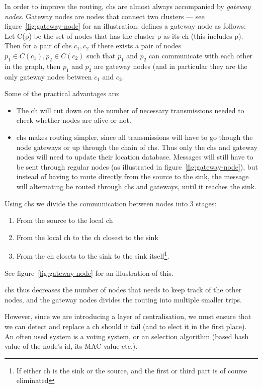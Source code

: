 In order to improve the routing, \acp{ch} are almost always accompanied by \emph{gateway nodes}. Gateway nodes are nodes that connect two clusters --- see figure~\ref{fig:gateway-node} for an illustration. \cite{spanners} defines a gateway node as follows:
Let C(p) be the set of nodes that has the cluster p as its \ac{ch} (this includes p). Then for a pair of \acp{ch} $c_1, c_2$ if there exists a pair of nodes $p_1 \in C(c_1), p_2 \in C(c_2)$ such that $p_1$ and $p_2$ can communicate with each other in the graph, then $p_1$ and $p_2$ are gateway nodes (and in particular they are the only gateway nodes between $c_1$ and $c_2$.  

Some of the practical advantages are:
\begin{itemize}
\item The \ac{ch} will cut down on the number of necessary transmissions needed to check whether nodes are alive or not.
\item \acp{ch} makes routing simpler, since all transmissions will have to go though the node gateways or up through the chain of \acp{ch}. Thus only the \acp{ch} and gateway nodes will need to update their location database. Messages will still have to be sent through regular nodes (as illustrated in figure~\ref{fig:gateway-node}), but instead of having to route directly from the source to the sink, the message will alternating be routed through \acp{ch} and gateways, until it reaches the sink.
\end{itemize}

Using \acp{ch} we divide the communication between nodes into 3 stages:
\begin{enumerate}
\item From the source to the local \ac{ch} 
\item From the local \ac{ch} to the \ac{ch} closest to the sink
\item From the \ac{ch} closets to the sink to the sink itself\footnote{If either \ac{ch} is the sink or the source, and the first or third part is of course eliminated}.
\end{enumerate}
See figure~\ref{fig:gateway-node} for an illustration of this.

 \acp{ch} thus decreases the number of nodes that needs to keep track of the other nodes, and the gateway nodes divides the routing into multiple smaller trips.  

However, since we are introducing a layer of centralisation, we must ensure that we can detect and replace a \ac{ch} should it fail (and to elect it in the first place). An often used system is a voting system, or an selection algorithm (based hash value of the node's id, its MAC value etc.).

